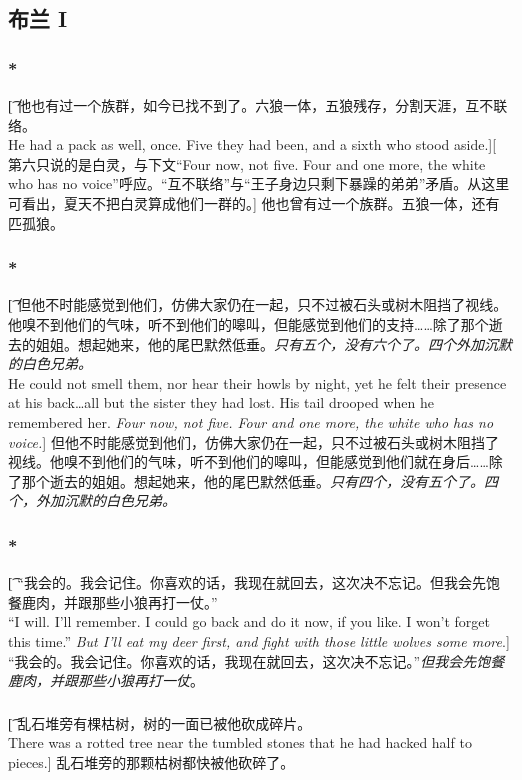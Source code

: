 \documentclass[12pt,a4paper]{article}
\begin{document}
\subsection{布兰 I}

\subsubsection{\color{red}*}\t[		
他也有过一个族群，如今已找不到了。六狼一体，五狼残存，分割天涯，互不联络。	\\		
He had a pack as well, once. Five they had been, and a sixth who stood aside.][		
第六只说的是白灵，与下文“Four now, not five. Four and one more, the white who has no voice”呼应。“互不联络”与“王子身边只剩下暴躁的弟弟”矛盾。从这里可看出，夏天不把白灵算成他们一群的。]		
他也曾有过一个族群。五狼一体，还有匹孤狼。		

\subsubsection{\color{red}*}\t[		
但他不时能感觉到他们，仿佛大家仍在一起，只不过被石头或树木阻挡了视线。他嗅不到他们的气味，听不到他们的嗥叫，但能感觉到他们的支持……除了那个逝去的姐姐。想起她来，他的尾巴默然低垂。\emph{只有五个，没有六个了。四个外加沉默的白色兄弟。}\\		
He could not smell them, nor hear their howls by night, yet he felt their presence at his back\ldots all but the sister they had lost. His tail drooped when he remembered her. \emph{Four now, not five. Four and one more, the white who has no voice.}]		
但他不时能感觉到他们，仿佛大家仍在一起，只不过被石头或树木阻挡了视线。他嗅不到他们的气味，听不到他们的嗥叫，但能感觉到他们就在身后……除了那个逝去的姐姐。想起她来，他的尾巴默然低垂。\emph{只有四个，没有五个了。四个，外加沉默的白色兄弟。}

\subsubsection{\color{red}*}\t[
	 “我会的。我会记住。你喜欢的话，我现在就回去，这次决不忘记。但我会先饱餐鹿肉，并跟那些小狼再打一仗。”\\
	“I will. I'll remember. I could go back and do it now, if you like. I won't forget this time.” \emph{But I'll eat my deer first, and fight with those little wolves some more}.]
	“我会的。我会记住。你喜欢的话，我现在就回去，这次决不忘记。”\emph{但我会先饱餐鹿肉，并跟那些小狼再打一仗}。
	
	\subsubsection{}\t[		
	乱石堆旁有棵枯树，树的一面已被他砍成碎片。\\		
	There was a rotted tree near the tumbled stones that he had hacked half to pieces.]			
	乱石堆旁的那颗枯树都快被他砍碎了。
	
\end{document}
